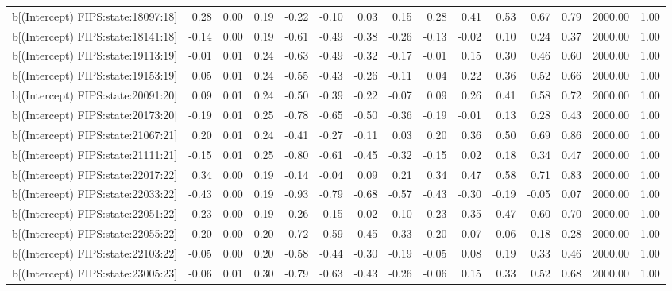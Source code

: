\begin{table}[ht]
\begin{tabular}{rrrrrrrrrrrrrrr}
  b[(Intercept) FIPS:state:18097:18] & 0.28 & 0.00 & 0.19 & -0.22 & -0.10 & 0.03 & 0.15 & 0.28 & 0.41 & 0.53 & 0.67 & 0.79 & 2000.00 & 1.00 \\ 
  b[(Intercept) FIPS:state:18141:18] & -0.14 & 0.00 & 0.19 & -0.61 & -0.49 & -0.38 & -0.26 & -0.13 & -0.02 & 0.10 & 0.24 & 0.37 & 2000.00 & 1.00 \\ 
  b[(Intercept) FIPS:state:19113:19] & -0.01 & 0.01 & 0.24 & -0.63 & -0.49 & -0.32 & -0.17 & -0.01 & 0.15 & 0.30 & 0.46 & 0.60 & 2000.00 & 1.00 \\ 
  b[(Intercept) FIPS:state:19153:19] & 0.05 & 0.01 & 0.24 & -0.55 & -0.43 & -0.26 & -0.11 & 0.04 & 0.22 & 0.36 & 0.52 & 0.66 & 2000.00 & 1.00 \\ 
  b[(Intercept) FIPS:state:20091:20] & 0.09 & 0.01 & 0.24 & -0.50 & -0.39 & -0.22 & -0.07 & 0.09 & 0.26 & 0.41 & 0.58 & 0.72 & 2000.00 & 1.00 \\ 
  b[(Intercept) FIPS:state:20173:20] & -0.19 & 0.01 & 0.25 & -0.78 & -0.65 & -0.50 & -0.36 & -0.19 & -0.01 & 0.13 & 0.28 & 0.43 & 2000.00 & 1.00 \\ 
  b[(Intercept) FIPS:state:21067:21] & 0.20 & 0.01 & 0.24 & -0.41 & -0.27 & -0.11 & 0.03 & 0.20 & 0.36 & 0.50 & 0.69 & 0.86 & 2000.00 & 1.00 \\ 
  b[(Intercept) FIPS:state:21111:21] & -0.15 & 0.01 & 0.25 & -0.80 & -0.61 & -0.45 & -0.32 & -0.15 & 0.02 & 0.18 & 0.34 & 0.47 & 2000.00 & 1.00 \\ 
  b[(Intercept) FIPS:state:22017:22] & 0.34 & 0.00 & 0.19 & -0.14 & -0.04 & 0.09 & 0.21 & 0.34 & 0.47 & 0.58 & 0.71 & 0.83 & 2000.00 & 1.00 \\ 
  b[(Intercept) FIPS:state:22033:22] & -0.43 & 0.00 & 0.19 & -0.93 & -0.79 & -0.68 & -0.57 & -0.43 & -0.30 & -0.19 & -0.05 & 0.07 & 2000.00 & 1.00 \\ 
  b[(Intercept) FIPS:state:22051:22] & 0.23 & 0.00 & 0.19 & -0.26 & -0.15 & -0.02 & 0.10 & 0.23 & 0.35 & 0.47 & 0.60 & 0.70 & 2000.00 & 1.00 \\ 
  b[(Intercept) FIPS:state:22055:22] & -0.20 & 0.00 & 0.20 & -0.72 & -0.59 & -0.45 & -0.33 & -0.20 & -0.07 & 0.06 & 0.18 & 0.28 & 2000.00 & 1.00 \\ 
  b[(Intercept) FIPS:state:22103:22] & -0.05 & 0.00 & 0.20 & -0.58 & -0.44 & -0.30 & -0.19 & -0.05 & 0.08 & 0.19 & 0.33 & 0.46 & 2000.00 & 1.00 \\ 
  b[(Intercept) FIPS:state:23005:23] & -0.06 & 0.01 & 0.30 & -0.79 & -0.63 & -0.43 & -0.26 & -0.06 & 0.15 & 0.33 & 0.52 & 0.68 & 2000.00 & 1.00 \\ 

\end{tabular}
\end{table}

